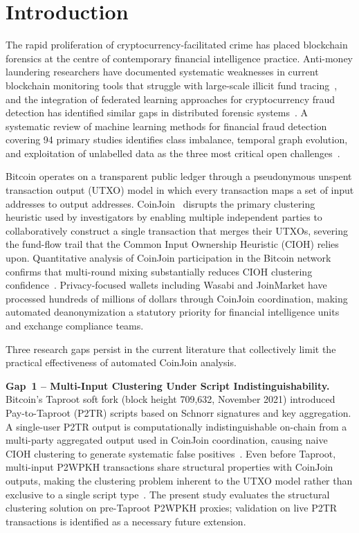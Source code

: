 \documentclass[12pt,a4paper]{article}
\begin{document}
\section{Introduction}
\label{sec:intro}

The rapid proliferation of cryptocurrency-facilitated crime
has placed blockchain forensics at the centre of contemporary
financial intelligence practice. Anti-money laundering
researchers have documented systematic weaknesses in current
blockchain monitoring tools that struggle with large-scale
illicit fund tracing~\citep{lo2023}, and the integration of
federated learning approaches for cryptocurrency fraud
detection has identified similar gaps in distributed
forensic systems~\citep{ahmed2024fed}. A systematic review of
machine learning methods for financial fraud detection
covering 94 primary studies identifies class imbalance,
temporal graph evolution, and exploitation of unlabelled data
as the three most critical open challenges~\citep{motie2024}.

Bitcoin operates on a transparent public ledger through a
pseudonymous unspent transaction output (UTXO) model in
which every transaction maps a set of input addresses to
output addresses. CoinJoin~\citep{ouyang2024btc} disrupts the
primary clustering heuristic used by investigators by enabling
multiple independent parties to collaboratively construct a
single transaction that merges their UTXOs, severing the
fund-flow trail that the Common Input Ownership Heuristic
(CIOH) relies upon. Quantitative analysis of CoinJoin
participation in the Bitcoin network confirms that multi-round
mixing substantially reduces CIOH clustering
confidence~\citep{coinjoin2024tdsc}. Privacy-focused wallets
including Wasabi and JoinMarket have processed hundreds of
millions of dollars through CoinJoin coordination, making
automated deanonymization a statutory priority for financial
intelligence units and exchange compliance teams.

Three research gaps persist in the current literature that
collectively limit the practical effectiveness of automated
CoinJoin analysis.

\textbf{Gap~1 -- Multi-Input Clustering Under Script
Indistinguishability.}
Bitcoin's Taproot soft fork (block height 709,632, November
2021) introduced Pay-to-Taproot (P2TR) scripts based on
Schnorr signatures and key aggregation. A single-user P2TR
output is computationally indistinguishable on-chain from a
multi-party aggregated output used in CoinJoin coordination,
causing naive CIOH clustering to generate systematic false
positives~\citep{lee2024}. Even before Taproot, multi-input
P2WPKH transactions share structural properties with
CoinJoin outputs, making the clustering problem inherent to
the UTXO model rather than exclusive to a single script
type~\citep{asiri2025}. The present study evaluates the
structural clustering solution on pre-Taproot P2WPKH
proxies; validation on live P2TR transactions is identified
as a necessary future extension.
\end{document}
